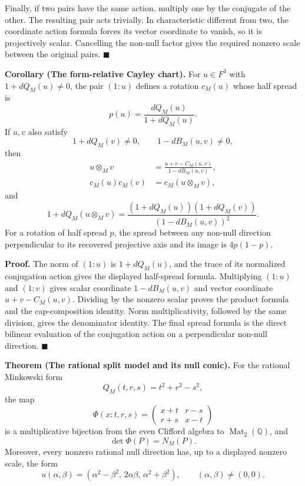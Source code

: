 \documentclass[11pt]{article}
\begin{document}
Finally, if two pairs have the same action, multiply one by the conjugate of
the other.  The resulting pair acts trivially.  In characteristic different
from two, the coordinate action formula forces its vector coordinate to
vanish, so it is projectively scalar.  Cancelling the non-null factor gives
the required nonzero scale between the original pairs.
\hfill\(\blacksquare\)

\medskip
\noindent\textbf{Corollary (The form-relative Cayley chart).}
For \(u\in F^3\) with \(1+dQ_M(u)\ne0\), the pair \((1:u)\) defines a
rotation \(c_M(u)\) whose half spread is
\[
 p(u)=\frac{dQ_M(u)}{1+dQ_M(u)}.
\]
If \(u,v\) also satisfy
\[
 1+dQ_M(v)\ne0,\qquad 1-dB_M(u,v)\ne0,
\]
then
\[
\begin{split}
 u\otimes_M v
   &=\frac{u+v-C_M(u,v)}{1-dB_M(u,v)},\\
 c_M(u)c_M(v)&=c_M(u\otimes_M v),
\end{split}
\]
and
\[
 1+dQ_M(u\otimes_M v)
 =
 \frac{(1+dQ_M(u))(1+dQ_M(v))}
      {(1-dB_M(u,v))^2}.
\]
For a rotation of half spread \(p\), the spread between any non-null
direction perpendicular to its recovered projective axis and its image is
\(4p(1-p)\).

\smallskip
\noindent\textbf{Proof.}
The norm of \((1:u)\) is \(1+dQ_M(u)\), and the trace of its normalized
conjugation action gives the displayed half-spread formula.  Multiplying
\((1:u)\) and \((1:v)\) gives scalar coordinate
\(1-dB_M(u,v)\) and vector coordinate
\(u+v-C_M(u,v)\).  Dividing by the nonzero scalar proves the product formula
and the cap-composition identity.  Norm multiplicativity, followed by the
same division, gives the denominator identity.  The final spread formula is
the direct bilinear evaluation of the conjugation action on a perpendicular
non-null direction.
\hfill\(\blacksquare\)

\medskip
\noindent\textbf{Theorem (The rational split model and its null conic).}
For the rational Minkowski form
\[
 Q_M(t,r,s)=t^2+r^2-s^2,
\]
the map
\[
 \Phi(x:t,r,s)=
 \begin{pmatrix}
 x+t&r-s\\
 r+s&x-t
 \end{pmatrix}
\]
is a multiplicative bijection from the even Clifford algebra to
\(\operatorname{Mat}_{2}(\mathbb Q)\), and
\[
 \det\Phi(P)=N_M(P).
\]
Moreover, every nonzero rational null direction has, up to a displayed
nonzero scale, the form
\[
 u(\alpha,\beta)=
 (\alpha^2-\beta^2,\,2\alpha\beta,\,\alpha^2+\beta^2),
 \qquad(\alpha,\beta)\ne(0,0).
\]
\end{document}
